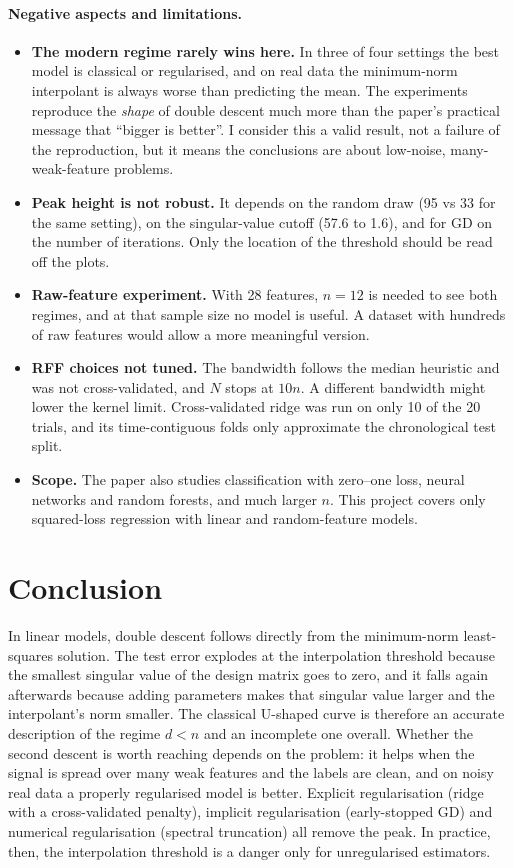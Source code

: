 \documentclass[10pt,a4paper]{article}
\begin{document}
\paragraph{Negative aspects and limitations.}
\begin{itemize}
  \item \textbf{The modern regime rarely wins here.} In three of four settings the best model is classical or regularised, and on real data the minimum-norm interpolant is always worse than predicting the mean. The experiments reproduce the \emph{shape} of double descent much more than the paper's practical message that ``bigger is better''. I consider this a valid result, not a failure of the reproduction, but it means the conclusions are about low-noise, many-weak-feature problems.
  \item \textbf{Peak height is not robust.} It depends on the random draw (95 vs 33 for the same setting), on the singular-value cutoff (57.6 to 1.6), and for GD on the number of iterations. Only the location of the threshold should be read off the plots.
  \item \textbf{Raw-feature experiment.} With 28 features, $n=12$ is needed to see both regimes, and at that sample size no model is useful. A dataset with hundreds of raw features would allow a more meaningful version.
  \item \textbf{RFF choices not tuned.} The bandwidth follows the median heuristic and was not cross-validated, and $N$ stops at $10n$. A different bandwidth might lower the kernel limit. Cross-validated ridge was run on only 10 of the 20 trials, and its time-contiguous folds only approximate the chronological test split.
  \item \textbf{Scope.} The paper also studies classification with zero--one loss, neural networks and random forests, and much larger $n$. This project covers only squared-loss regression with linear and random-feature models.
\end{itemize}

\section{Conclusion}
In linear models, double descent follows directly from the minimum-norm least-squares solution. The test error explodes at the interpolation threshold because the smallest singular value of the design matrix goes to zero, and it falls again afterwards because adding parameters makes that singular value larger and the interpolant's norm smaller. The classical U-shaped curve is therefore an accurate description of the regime $d<n$ and an incomplete one overall. Whether the second descent is worth reaching depends on the problem: it helps when the signal is spread over many weak features and the labels are clean, and on noisy real data a properly regularised model is better. Explicit regularisation (ridge with a cross-validated penalty), implicit regularisation (early-stopped GD) and numerical regularisation (spectral truncation) all remove the peak. In practice, then, the interpolation threshold is a danger only for unregularised estimators.
\end{document}
